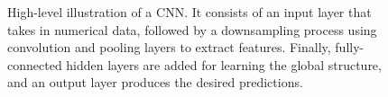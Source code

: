 \begin{figure}[ht]
    \caption[High-level CNN diagram \cite{tikz}.]{\small{High-level illustration of a CNN. It consists of an input layer that takes in numerical data, followed by a downsampling process using convolution and pooling layers to extract features. Finally, fully-connected hidden layers are added for learning the global structure, and an output layer produces the desired predictions.}}
    \label{fig: CNN colour diagram}
\end{figure}